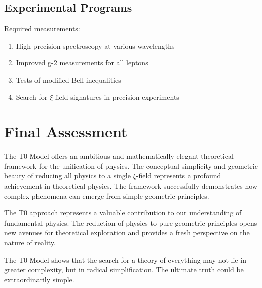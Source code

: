 \documentclass[12pt,a4paper]{report}
\begin{document}
	\subsection{Experimental Programs}
	
	Required measurements:
	
	\begin{enumerate}
		\item High-precision spectroscopy at various wavelengths
		\item Improved g-2 measurements for all leptons
		\item Tests of modified Bell inequalities
		\item Search for $\xi$-field signatures in precision experiments
	\end{enumerate}
	
	\section{Final Assessment}
	
	The T0 Model offers an ambitious and mathematically elegant theoretical framework for the unification of physics. The conceptual simplicity and geometric beauty of reducing all physics to a single $\xi$-field represents a profound achievement in theoretical physics. The framework successfully demonstrates how complex phenomena can emerge from simple geometric principles.
	
	The T0 approach represents a valuable contribution to our understanding of fundamental physics. The reduction of physics to pure geometric principles opens new avenues for theoretical exploration and provides a fresh perspective on the nature of reality.
	
	\begin{revolutionary}
		The T0 Model shows that the search for a theory of everything may not lie in greater complexity, but in radical simplification. The ultimate truth could be extraordinarily simple.
	\end{revolutionary}
	
\end{document}
